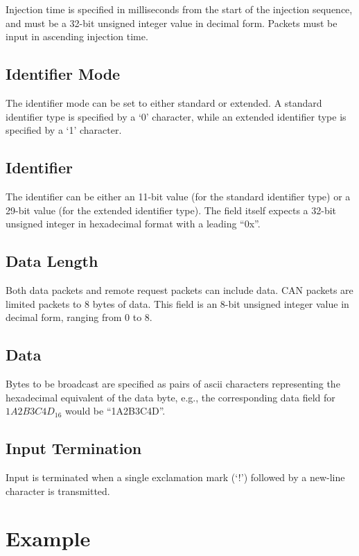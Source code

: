 Injection time is specified in milliseconds from the start of the injection sequence, and must be a 32-bit unsigned integer value in decimal form. Packets must be input in ascending injection time.

\subsection*{Identifier Mode}

The identifier mode can be set to either standard or extended. A standard identifier type is specified by a `0' character, while an extended identifier type is specified by a `1' character.

\subsection*{Identifier}

The identifier can be either an 11-bit value (for the standard identifier type) or a 29-bit value (for the extended identifier type). The field itself expects a 32-bit unsigned integer in hexadecimal format with a leading {}``0x''.

\subsection*{Data Length}

Both data packets and remote request packets can include data. CAN packets are limited packets to 8 bytes of data. This field is an 8-bit unsigned integer value in decimal form, ranging from 0 to 8.

\subsection*{Data}

Bytes to be broadcast are specified as pairs of ascii characters representing the hexadecimal equivalent of the data byte, e.g., the corresponding data field for $1A2B3C4D_{16}$ would be {}``1A2B3C4D''.

\subsection*{Input Termination}

Input is terminated when a single exclamation mark (`!') followed by a new-line character is transmitted. 

\section*{Example}

